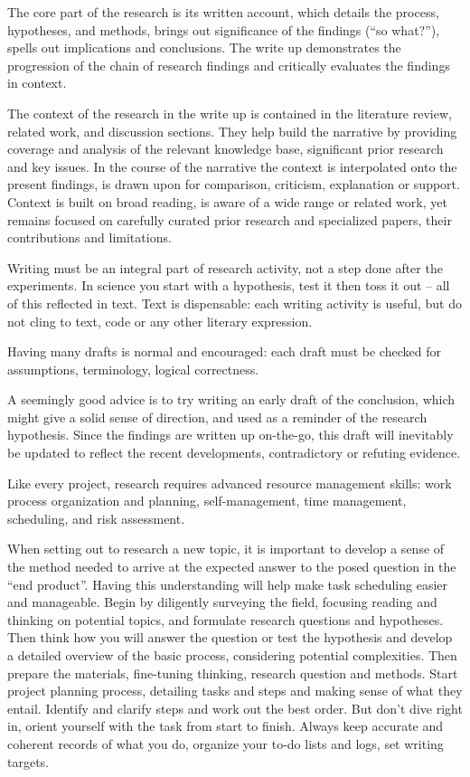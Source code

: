 \documentclass[10pt,a4paper,twocolumn]{article}
\begin{document}
The core part of the research is its written account, which details the process, hypotheses,
and methods, brings out significance of the findings (``so what?''), spells out implications
and conclusions. The write up demonstrates the progression of the chain of research findings
and critically evaluates the findings in context.

The context of the research in the write up is contained in the literature review, related
work, and discussion sections. They help build the narrative by providing coverage and
analysis of the relevant knowledge base, significant prior research and key issues. In the
course of the narrative the context is interpolated onto the present findings, is drawn
upon for comparison, criticism, explanation or support. Context is built on broad reading,
is aware of a wide range or related work, yet remains focused on carefully curated prior
research and specialized papers, their contributions and limitations.

Writing must be an integral part of research activity, not a step done after the experiments.
In science you start with a hypothesis, test it then toss it out -- all of this reflected
in text. Text is dispensable: each writing activity is useful, but do not cling to text,
code or any other literary expression.

Having many drafts is normal and encouraged: each draft must be checked for assumptions,
terminology, logical correctness.

A seemingly good advice is to try writing an early draft of the conclusion, which might
give a solid sense of direction, and used as a reminder of the research hypothesis. Since
the findings are written up on-the-go, this draft will inevitably be updated to reflect the
recent developments, contradictory or refuting evidence.

Like every project, research requires advanced resource management skills: work process
organization and planning, self-management, time management, scheduling, and risk assessment.

When setting out to research a new topic, it is important to develop a sense of the method
needed to arrive at the expected answer to the posed question in the ``end product''. Having
this understanding will help make task scheduling easier and manageable.
%
Begin by diligently surveying the field, focusing reading and thinking on potential topics,
and formulate research questions and hypotheses. Then think how you will answer the question
or test the hypothesis and develop a detailed overview of the basic process, considering
potential complexities.
%
Then prepare the materials, fine-tuning thinking, research question and methods. Start project
planning process, detailing tasks and steps and making sense of what they entail. Identify and
clarify steps and work out the best order. But don't dive right in, orient yourself with the
task from start to finish. Always keep accurate and coherent records of what you do, organize
your to-do lists and logs, set writing targets.
\end{document}

